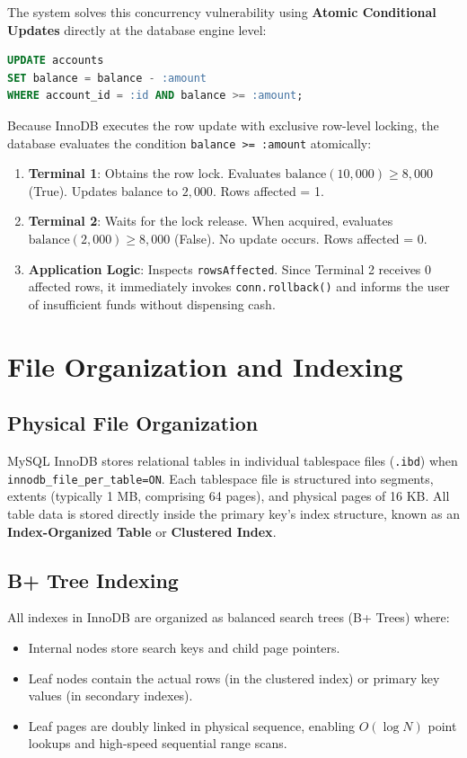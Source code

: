 \documentclass[11pt,a4paper]{report}
\begin{document}
The system solves this concurrency vulnerability using \textbf{Atomic Conditional Updates} directly at the database engine level:
\begin{lstlisting}[language=SQL]
UPDATE accounts 
SET balance = balance - :amount 
WHERE account_id = :id AND balance >= :amount;
\end{lstlisting}
Because InnoDB executes the row update with exclusive row-level locking, the database evaluates the condition \texttt{balance >= :amount} atomically:
\begin{enumerate}
    \item \textbf{Terminal 1}: Obtains the row lock. Evaluates $\text{balance} (10,000) \ge 8,000$ (True). Updates balance to $2,000$. Rows affected = 1.
    \item \textbf{Terminal 2}: Waits for the lock release. When acquired, evaluates $\text{balance} (2,000) \ge 8,000$ (False). No update occurs. Rows affected = 0.
    \item \textbf{Application Logic}: Inspects \texttt{rowsAffected}. Since Terminal 2 receives 0 affected rows, it immediately invokes \texttt{conn.rollback()} and informs the user of insufficient funds without dispensing cash.
\end{enumerate}

\newpage

\section{File Organization and Indexing}

\subsection{Physical File Organization}
MySQL InnoDB stores relational tables in individual tablespace files (\texttt{.ibd}) when \texttt{innodb\_file\_per\_table=ON}. 
Each tablespace file is structured into segments, extents (typically 1 MB, comprising 64 pages), and physical pages of 16 KB. All table data is stored directly inside the primary key's index structure, known as an \textbf{Index-Organized Table} or \textbf{Clustered Index}.

\subsection{B+ Tree Indexing}
All indexes in InnoDB are organized as balanced search trees (B+ Trees) where:
\begin{itemize}
    \item Internal nodes store search keys and child page pointers.
    \item Leaf nodes contain the actual rows (in the clustered index) or primary key values (in secondary indexes).
    \item Leaf pages are doubly linked in physical sequence, enabling $O(\log N)$ point lookups and high-speed sequential range scans.
\end{itemize}
\end{document}
